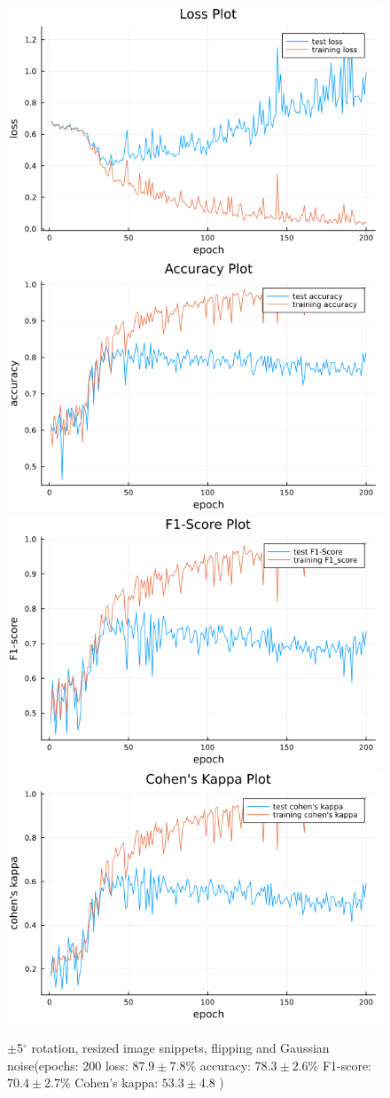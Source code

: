 \documentclass[
a4paper, 
12pt,
grayscalebody, %
abstract=on,
twoside, BCOR10mm, 12pt, DIV13,headinclude, footexclude, final, abstracton, openright
]{ibireprt}
\numberwithin{equation}{chapter}
\numberwithin{table}{chapter}
\numberwithin{figure}{chapter}
\numberwithin{algorithm}{chapter}
\numberwithin{example}{chapter}
\numberwithin{example}{chapter}
\begin{document}
\begin{figure}
	\includegraphics[width=0.4\linewidth]{loss_png_final_run_0_4.png}\hfill
\includegraphics[width=0.4\linewidth]{accuracy_png_final_run_0_4.png}
\\[\smallskipamount]
\includegraphics[width=0.4\linewidth]{f1_score_png_final_run_0_4.png}\hfill
\includegraphics[width=0.4\linewidth]{cohens_kappa_png_final_run_0_4.png}
	\caption{$\pm$5$^{\circ}$ rotation, resized image snippets, flipping and Gaussian noise(epochs: 200 loss: $87.9\pm7.8\% $ accuracy: $78.3\pm2.6\%$ F1-score: $70.4\pm2.7\%$  Cohen's kappa: $53.3\pm4.8$ )}
\end{figure}%
\end{document}
